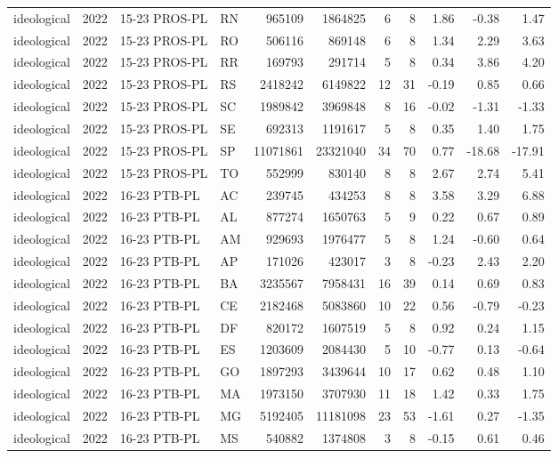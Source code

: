 \begin{landscape}
\begin{longtable}{lllL{1.4cm}rrrrrrr}
ideological & 2022 & 15-23 PROS-PL & RN & 965109 & 1864825 & 6 & 8 & 1.86 & -0.38 & 1.47 \\
ideological & 2022 & 15-23 PROS-PL & RO & 506116 & 869148 & 6 & 8 & 1.34 & 2.29 & 3.63 \\
ideological & 2022 & 15-23 PROS-PL & RR & 169793 & 291714 & 5 & 8 & 0.34 & 3.86 & 4.20 \\
ideological & 2022 & 15-23 PROS-PL & RS & 2418242 & 6149822 & 12 & 31 & -0.19 & 0.85 & 0.66 \\
ideological & 2022 & 15-23 PROS-PL & SC & 1989842 & 3969848 & 8 & 16 & -0.02 & -1.31 & -1.33 \\
ideological & 2022 & 15-23 PROS-PL & SE & 692313 & 1191617 & 5 & 8 & 0.35 & 1.40 & 1.75 \\
ideological & 2022 & 15-23 PROS-PL & SP & 11071861 & 23321040 & 34 & 70 & 0.77 & -18.68 & -17.91 \\
ideological & 2022 & 15-23 PROS-PL & TO & 552999 & 830140 & 8 & 8 & 2.67 & 2.74 & 5.41 \\
ideological & 2022 & 16-23 PTB-PL & AC & 239745 & 434253 & 8 & 8 & 3.58 & 3.29 & 6.88 \\
ideological & 2022 & 16-23 PTB-PL & AL & 877274 & 1650763 & 5 & 9 & 0.22 & 0.67 & 0.89 \\
ideological & 2022 & 16-23 PTB-PL & AM & 929693 & 1976477 & 5 & 8 & 1.24 & -0.60 & 0.64 \\
ideological & 2022 & 16-23 PTB-PL & AP & 171026 & 423017 & 3 & 8 & -0.23 & 2.43 & 2.20 \\
ideological & 2022 & 16-23 PTB-PL & BA & 3235567 & 7958431 & 16 & 39 & 0.14 & 0.69 & 0.83 \\
ideological & 2022 & 16-23 PTB-PL & CE & 2182468 & 5083860 & 10 & 22 & 0.56 & -0.79 & -0.23 \\
ideological & 2022 & 16-23 PTB-PL & DF & 820172 & 1607519 & 5 & 8 & 0.92 & 0.24 & 1.15 \\
ideological & 2022 & 16-23 PTB-PL & ES & 1203609 & 2084430 & 5 & 10 & -0.77 & 0.13 & -0.64 \\
ideological & 2022 & 16-23 PTB-PL & GO & 1897293 & 3439644 & 10 & 17 & 0.62 & 0.48 & 1.10 \\
ideological & 2022 & 16-23 PTB-PL & MA & 1973150 & 3707930 & 11 & 18 & 1.42 & 0.33 & 1.75 \\
ideological & 2022 & 16-23 PTB-PL & MG & 5192405 & 11181098 & 23 & 53 & -1.61 & 0.27 & -1.35 \\
ideological & 2022 & 16-23 PTB-PL & MS & 540882 & 1374808 & 3 & 8 & -0.15 & 0.61 & 0.46 \\

\end{longtable}
\end{landscape}
